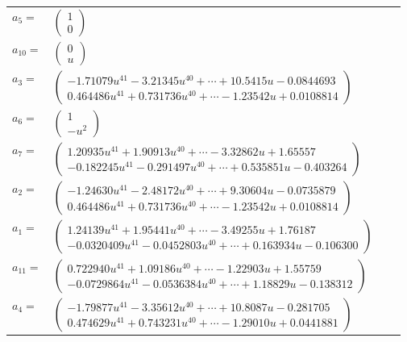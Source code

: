 \documentclass[1p]{elsarticle_modified}
\theoremstyle{definition}
\begin{document}
\begin{tabular}{m{7pt} m{180pt} m{7pt} m{180pt} }
\flushright $a_{5}=$&$\begin{pmatrix}1\\0\end{pmatrix}$ \\
\flushright $a_{10}=$&$\begin{pmatrix}0\\u\end{pmatrix}$ \\
\flushright $a_{3}=$&$\begin{pmatrix}-1.71079 u^{41}-3.21345 u^{40}+\cdots+10.5415 u-0.0844693\\0.464486 u^{41}+0.731736 u^{40}+\cdots-1.23542 u+0.0108814\end{pmatrix}$ \\
\flushright $a_{6}=$&$\begin{pmatrix}1\\- u^2\end{pmatrix}$ \\
\flushright $a_{7}=$&$\begin{pmatrix}1.20935 u^{41}+1.90913 u^{40}+\cdots-3.32862 u+1.65557\\-0.182245 u^{41}-0.291497 u^{40}+\cdots+0.535851 u-0.403264\end{pmatrix}$ \\
\flushright $a_{2}=$&$\begin{pmatrix}-1.24630 u^{41}-2.48172 u^{40}+\cdots+9.30604 u-0.0735879\\0.464486 u^{41}+0.731736 u^{40}+\cdots-1.23542 u+0.0108814\end{pmatrix}$ \\
\flushright $a_{1}=$&$\begin{pmatrix}1.24139 u^{41}+1.95441 u^{40}+\cdots-3.49255 u+1.76187\\-0.0320409 u^{41}-0.0452803 u^{40}+\cdots+0.163934 u-0.106300\end{pmatrix}$ \\
\flushright $a_{11}=$&$\begin{pmatrix}0.722940 u^{41}+1.09186 u^{40}+\cdots-1.22903 u+1.55759\\-0.0729864 u^{41}-0.0536384 u^{40}+\cdots+1.18829 u-0.138312\end{pmatrix}$ \\
\flushright $a_{4}=$&$\begin{pmatrix}-1.79877 u^{41}-3.35612 u^{40}+\cdots+10.8087 u-0.281705\\0.474629 u^{41}+0.743231 u^{40}+\cdots-1.29010 u+0.0441881\end{pmatrix}$ \\

\end{tabular}
\end{document}
